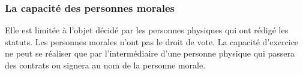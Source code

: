 \documentclass[11pt]{article}
\begin{document}
			\subsubsection{La capacité des personnes morales}
				Elle est limitée à l'objet décidé par les personnes physiques qui ont rédigé les statuts. Les personnes morales n'ont pas le droit de vote. La capacité d'exercice ne peut se réaliser que par l'intermédiaire d'une personne physique qui passera des contrats ou signera au nom de la personne morale.
\end{document}
